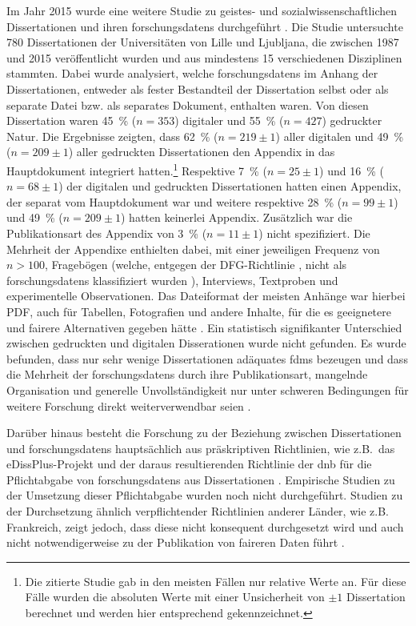 Im Jahr 2015 wurde eine weitere Studie zu geistes- und sozialwissenschaftlichen Dissertationen und ihren \glspl{forschungsdaten} durchgeführt \autocite{Schöpfel2015}.
Die Studie untersuchte \num{780} Dissertationen der Universitäten von Lille und Ljubljana, die zwischen 1987 und 2015 veröffentlicht wurden und aus mindestens 15 verschiedenen Disziplinen stammten.
Dabei wurde analysiert, welche \glspl{forschungsdaten} im Anhang der Dissertationen, entweder als fester Bestandteil der Dissertation selbst oder als separate Datei bzw. als separates Dokument, enthalten waren.
Von diesen Dissertation waren \SI{45}{\percent} ($n=\num{353}$) digitaler und \SI{55}{\percent} ($n=\num{427}$) gedruckter Natur.
Die Ergebnisse zeigten, dass \SI{62}{\percent} ($n=\num{219}\pm 1$) aller digitalen und \SI{49}{\percent} ($n=\num{209}\pm 1$) aller gedruckten Dissertationen den Appendix in das Hauptdokument integriert hatten.\footnote{Die zitierte Studie gab in den meisten Fällen nur relative Werte an. Für diese Fälle wurden die absoluten Werte mit einer Unsicherheit von $\pm 1$ Dissertation berechnet und werden hier entsprechend gekennzeichnet.}
Respektive \SI{7}{\percent} ($n=\num{25}\pm 1$) und \SI{16}{\percent} ($n=\num{68}\pm 1$) der digitalen und gedruckten Dissertationen hatten einen Appendix, der separat vom Hauptdokument war und weitere respektive \SI{28}{\percent} ($n=\num{99}\pm 1$) und \SI{49}{\percent} ($n=\num{209}\pm 1$) hatten keinerlei Appendix.
Zusätzlich war die Publikationsart des Appendix von \SI{3}{\percent} ($n=\num{11}\pm 1$) nicht spezifiziert.
Die Mehrheit der Appendixe enthielten dabei, mit einer jeweiligen Frequenz von $n>\num{100}$, Fragebögen (welche, entgegen der DFG-Richtlinie \autocite{dfg-richtlinie}, nicht als \glspl{forschungsdaten} klassifiziert wurden \autocite[14]{Schöpfel2015}), Interviews, Textproben und experimentelle Observationen.
Das Dateiformat der meisten Anhänge war hierbei PDF, auch für Tabellen, Fotografien und andere Inhalte, für die es geeignetere und \gls{fair}ere Alternativen gegeben hätte \autocite[14]{Schöpfel2015}.
Ein statistisch signifikanter Unterschied zwischen gedruckten und digitalen Disserationen wurde nicht gefunden.
Es wurde befunden, dass nur sehr wenige Dissertationen adäquates \glspl{fdm} bezeugen und dass die Mehrheit der \glspl{forschungsdaten} durch ihre Publikationsart, mangelnde Organisation und generelle Unvollständigkeit nur unter schweren Bedingungen für weitere Forschung direkt weiterverwendbar seien \autocite[S.~20f.]{Schöpfel2015}.

Darüber hinaus besteht die Forschung zu der Beziehung zwischen Dissertationen und \glspl{forschungsdaten} hauptsächlich aus präskriptiven Richtlinien, wie z.B.~das eDissPlus-Projekt \autocite{Weisbrod2017eDissPlus,Weisbrod2018,KleinebergKaden2018} und der daraus resultierenden Richtlinie der \gls{dnb} für die Pflichtabgabe von \glspl{forschungsdaten} aus Dissertationen \autocite{dnb2017}.
Empirische Studien zu der Umsetzung dieser Pflichtabgabe wurden noch nicht durchgeführt.
Studien zu der Durchsetzung ähnlich verpflichtender Richtlinien anderer Länder, wie z.B. Frankreich, zeigt jedoch, dass diese nicht konsequent durchgesetzt wird und auch nicht notwendigerweise zu der Publikation von \gls{fair}eren Daten führt \autocite[vgl.][]{Schöpfel2015}.